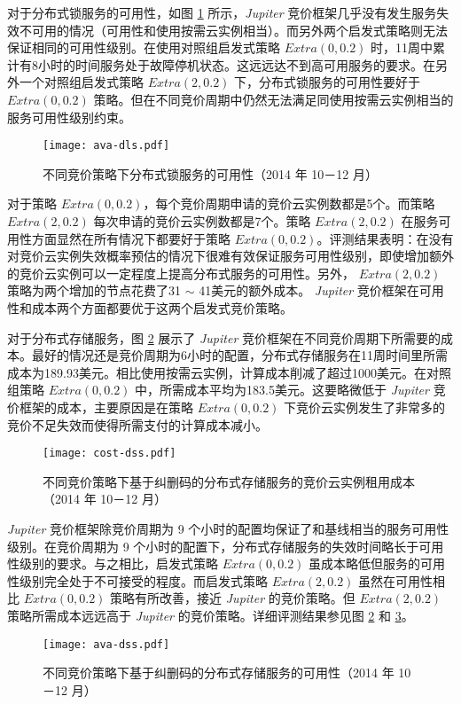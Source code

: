 对于分布式锁服务的可用性，如图 \ref{figure:dlsavailability} 所示，\emph{Jupiter} 竞价框架几乎没有发生服务失效不可用的情况（可用性和使用按需云实例相当）。而另外两个启发式策略则无法保证相同的可用性级别。在使用对照组启发式策略 $Extra(0, 0.2)$ 时，11周中累计有8小时的时间服务处于故障停机状态。这远远达不到高可用服务的要求。在另外一个对照组启发式策略 $Extra(2, 0.2)$ 下，分布式锁服务的可用性要好于 $Extra(0, 0.2)$ 策略。但在不同竞价周期中仍然无法满足同使用按需云实例相当的服务可用性级别约束。
\begin{figure}
  \centering
  \texttt{[image: ava-dls.pdf]}
  \caption{不同竞价策略下分布式锁服务的可用性（2014 年 10－12 月）}
  \label{figure:dlsavailability}
\end{figure}

对于策略 $Extra(0, 0.2)$，每个竞价周期申请的竞价云实例数都是5个。而策略 $Extra(2, 0.2)$ 每次申请的竞价云实例数都是7个。策略 $Extra(2, 0.2)$ 在服务可用性方面显然在所有情况下都要好于策略 $Extra(0, 0.2)$。评测结果表明：在没有对竞价云实例失效概率预估的情况下很难有效保证服务可用性级别，即使增加额外的竞价云实例可以一定程度上提高分布式服务的可用性。另外， $Extra(2, 0.2)$ 策略为两个增加的节点花费了31 $\sim$ 41美元的额外成本。 \emph{Jupiter} 竞价框架在可用性和成本两个方面都要优于这两个启发式竞价策略。

对于分布式存储服务，图 \ref{figure:dsscost} 展示了  \emph{Jupiter}  竞价框架在不同竞价周期下所需要的成本。最好的情况还是竞价周期为6小时的配置，分布式存储服务在11周时间里所需成本为189.93美元。相比使用按需云实例，计算成本削减了超过1000美元。在对照组策略 $Extra(0, 0.2)$ 中，所需成本平均为183.5美元。这要略微低于  \emph{Jupiter}  竞价框架的成本，主要原因是在策略 $Extra(0, 0.2)$ 下竞价云实例发生了非常多的竞价不足失效而使得所需支付的计算成本减小。
\begin{figure}
  \centering
  \texttt{[image: cost-dss.pdf]}
  \caption{不同竞价策略下基于纠删码的分布式存储服务的竞价云实例租用成本（2014 年 10－12 月）}
  \label{figure:dsscost}
\end{figure}

\emph{Jupiter} 竞价框架除竞价周期为 9 个小时的配置均保证了和基线相当的服务可用性级别。在竞价周期为 9 个小时的配置下，分布式存储服务的失效时间略长于可用性级别的要求。与之相比，启发式策略 $Extra(0, 0.2)$ 虽成本略低但服务的可用性级别完全处于不可接受的程度。而启发式策略 $Extra(2, 0.2)$ 虽然在可用性相比 $Extra(0, 0.2)$ 策略有所改善，接近 \emph{Jupiter}  的竞价策略。但 $Extra(2, 0.2)$ 策略所需成本远远高于 \emph{Jupiter} 的竞价策略。详细评测结果参见图 \ref{figure:dsscost} 和 \ref{figure:dssavailability}。
\begin{figure}
  \centering
  \texttt{[image: ava-dss.pdf]}
  \caption{不同竞价策略下基于纠删码的分布式存储服务的可用性（2014 年 10－12 月）}
  \label{figure:dssavailability}
\end{figure}

